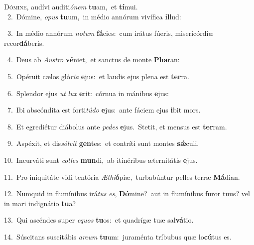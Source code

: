 \lettrine{\initial\textcolor{\initialcolor}{D}}{ómine,} audívi auditi\-\textit{ó}\-\textit{nem} \textbf{tu}\-am,~\star et \textbf{tí}\-mui.\\
{\numbfont\textcolor{\numbcolor}{~2.}}~Dómine, \textit{o}\-\textit{pus} \textbf{tu}\-um,~\star in médio annórum vivífica \textbf{il}\-lud:\par
{\numbfont\textcolor{\numbcolor}{~3.}}~In médio annórum \textit{no}\-\textit{tum} \textbf{fá}\-cies:~\star cum irátus fúeris, misericórdiæ recor\-\textbf{dá}\-beris.\par
{\numbfont\textcolor{\numbcolor}{~4.}}~Deus ab \textit{Aus}\-\textit{tro} \textbf{vé}\-niet,~\star et sanctus de monte \textbf{Pha}\-ran:\par
{\numbfont\textcolor{\numbcolor}{~5.}}~Opéruit cælos gló\-\textit{ri}\-\textit{a} \textbf{e}\-jus:~\star et laudis ejus plena est \textbf{ter}\-ra.\par
{\numbfont\textcolor{\numbcolor}{~6.}}~Splendor ejus \textit{ut} \textit{lux} \textbf{e}\-rit:~\star córnua in mánibus \textbf{e}\-jus:\par
{\numbfont\textcolor{\numbcolor}{~7.}}~Ibi abscóndita est forti\-\textit{tú}\-\textit{do} \textbf{e}\-jus:~\star ante fáciem ejus \textbf{i}\-bit mors.\par
{\numbfont\textcolor{\numbcolor}{~8.}}~Et egrediétur diábolus ante \textit{pe}\-\textit{des} \textbf{e}\-jus.~\star Stetit, et mensus est \textbf{ter}\-ram.\par
{\numbfont\textcolor{\numbcolor}{~9.}}~Aspéxit, et dis\-\textit{sól}\-\textit{vit} \textbf{gen}\-tes:~\star et contríti sunt montes \textbf{sǽ}\-culi.\par
{\numbfont\textcolor{\numbcolor}{10.}}~Incurváti sunt \textit{col}\-\textit{les} \textbf{mun}\-di,~\star ab itinéribus æternitátis \textbf{e}\-jus.\par
{\numbfont\textcolor{\numbcolor}{11.}}~Pro iniquitáte vidi tentória \textit{Æ}\-\textit{thi}\textbf{ó}piæ,~\star turbabúntur pelles terræ \textbf{Má}\-dian.\par
{\numbfont\textcolor{\numbcolor}{12.}}~Numquid in flumínibus irá\textit{tus} \textit{es}\-, \textbf{Dó}\-mine?~\star aut in flumínibus furor tuus? vel in mari indignátio \textbf{tu}\-a?\par
{\numbfont\textcolor{\numbcolor}{13.}}~Qui ascéndes super \textit{e}\-\textit{quos} \textbf{tu}\-os:~\star et quadrígæ tuæ sal\-\textbf{vá}\-tio.\par
{\numbfont\textcolor{\numbcolor}{14.}}~Súscitans suscitábis \textit{ar}\-\textit{cum} \textbf{tu}\-um:~\star juraménta tríbubus quæ lo\-\textbf{cú}\-tus es.\par
